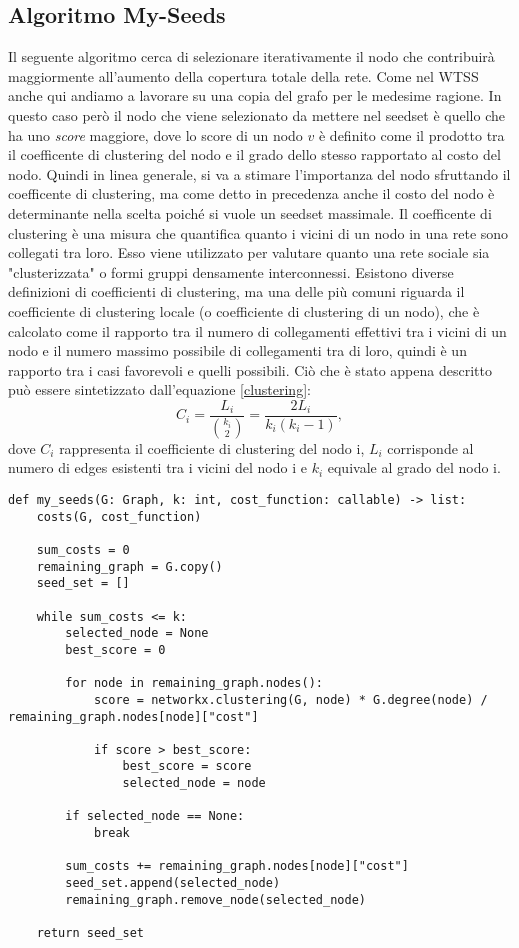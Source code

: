 \subsection{Algoritmo My-Seeds}
Il seguente algoritmo cerca di selezionare iterativamente il nodo che contribuirà maggiormente all'aumento della copertura totale della rete. Come nel WTSS anche qui andiamo a lavorare su una copia del grafo per le medesime ragione. In questo caso però il nodo che viene selezionato da mettere nel seedset è quello che ha uno \textit{score} maggiore, dove lo score di un nodo $v$ è definito come il prodotto tra il coefficente di clustering del nodo e il grado dello stesso rapportato al costo del nodo. Quindi in linea generale, si va a stimare l'importanza del nodo sfruttando il coefficente di clustering, ma come detto in precedenza anche il costo del nodo è determinante nella scelta poiché si vuole un seedset massimale. Il coefficente di clustering è una misura che quantifica quanto i vicini di un nodo in una rete sono collegati tra loro. Esso viene utilizzato per valutare quanto una rete sociale sia "clusterizzata" o formi gruppi densamente interconnessi. Esistono diverse definizioni di coefficienti di clustering, ma una delle più comuni riguarda il coefficiente di clustering locale (o coefficiente di clustering di un nodo), che è calcolato come il rapporto tra il numero di collegamenti effettivi tra i vicini di un nodo e il numero massimo possibile di collegamenti tra di loro, quindi è un rapporto tra i casi favorevoli e quelli possibili. Ciò che è stato appena descritto può essere sintetizzato dall'equazione \ref{clustering}: 
\begin{equation}
C_i=\frac{L_i}{\binom{k_i}{2}}=\frac{2 L_i}{k_i\left(k_i-1\right)},
\label{clustering}
\end{equation}
dove $C_i$ rappresenta il coefficiente di clustering del nodo i, $L_i$ corrisponde al numero di edges esistenti tra i vicini del nodo i e $k_i$ equivale al grado del nodo i.

\begin{code}
\begin{verbatim}
def my_seeds(G: Graph, k: int, cost_function: callable) -> list:
    costs(G, cost_function)

    sum_costs = 0
    remaining_graph = G.copy()
    seed_set = []

    while sum_costs <= k:
        selected_node = None
        best_score = 0

        for node in remaining_graph.nodes():
            score = networkx.clustering(G, node) * G.degree(node) / remaining_graph.nodes[node]["cost"]

            if score > best_score:
                best_score = score
                selected_node = node

        if selected_node == None:
            break

        sum_costs += remaining_graph.nodes[node]["cost"]
        seed_set.append(selected_node)
        remaining_graph.remove_node(selected_node)
        
    return seed_set 
\end{verbatim}
\end{code}

